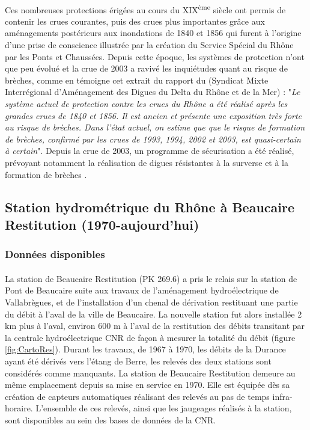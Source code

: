 \documentclass[11pt]{article}
\begin{document}
		\paragraph{} Ces nombreuses protections érigées au cours du XIX\textsuperscript{ème} siècle ont permis de contenir les crues courantes, puis des crues plus importantes grâce aux aménagements postérieurs aux inondations de 1840 et 1856 qui furent à l'origine d'une prise de conscience illustrée par la création du Service Spécial du Rhône par les Ponts et Chaussées. Depuis cette époque, les systèmes de protection n'ont que peu évolué et la crue de 2003 a ravivé les inquiétudes quant au risque de brèches, comme en témoigne cet extrait du rapport du \citet{symadrem_programme_2012} (Syndicat Mixte Interrégional d'Aménagement des Digues du Delta du Rhône et de la Mer) : "\textit{Le système actuel de protection contre les crues du Rhône a été réalisé après les grandes crues de 1840 et 1856. Il est ancien et présente une exposition très forte au risque de brèches. Dans l'état actuel, on estime que que le risque de formation de brèches, confirmé par les crues de 1993, 1994, 2002 et 2003, est quasi-certain à certain}". Depuis la crue de 2003, un programme de sécurisation a été réalisé, prévoyant notamment la réalisation de digues résistantes à la surverse et à la formation de brèches \citep{symadrem_programme_2012}.    
		
	
\FloatBarrier
	\subsection{Station hydrométrique du Rhône à Beaucaire Restitution (1970-aujourd'hui)}
	
	\subsubsection{Données disponibles}

	\paragraph{} La station de Beaucaire Restitution (PK 269.6) a pris le relais sur la station de Pont de Beaucaire suite aux travaux de l'aménagement hydroélectrique de Vallabrègues, et de l'installation d'un chenal de dérivation restituant une partie du débit à l'aval de la ville de Beaucaire. La nouvelle station fut alors installée 2 km plus à l'aval, environ 600 m à l'aval de la restitution des débits transitant par la centrale hydroélectrique CNR de façon à mesurer la totalité du débit (figure \ref{fig:CartoRes}). Durant les travaux, de 1967 à 1970, les débits de la Durance ayant été dérivés vers l'étang de Berre, les relevés des deux stations sont considérés comme manquants. La station de Beaucaire Restitution demeure au même emplacement depuis sa mise en service en 1970. Elle est équipée dès sa création de capteurs automatiques réalisant des relevés au pas de temps infra-horaire. L'ensemble de ces relevés, ainsi que les jaugeages réalisés à la station, sont disponibles au sein des bases de données de la CNR.
		
\end{document}
